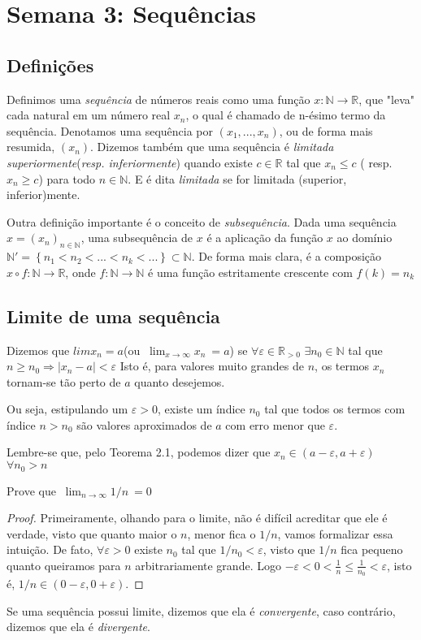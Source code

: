 

\section{Semana 3: Sequências } 
\subsection{Definições}
Definimos uma \textit{sequência} de números reais como uma função $x: \mathbb{N} \rightarrow \mathbb{R}$, que "leva" cada natural em um número real $x_{n}$, o qual é chamado de n-ésimo termo da sequência. Denotamos uma sequência por $(x_{1},...,x_{n})$, ou de forma mais resumida, $(x_{n})$. Dizemos também que uma sequência é \textit{limitada superiormente}(\textit{resp. inferiormente}) quando existe $c \in \mathbb{R}$ tal que $x_{n} \leq c$ ( resp. $x_{n} \geq c$) para todo $n \in \mathbb{N}$. E é dita \textit{limitada} se for limitada (superior, inferior)mente.

Outra definição importante é o conceito de \textit{subsequência}. Dada uma sequência $x=(x_{n})_{n \in \mathbb{N}}$, uma subsequência de $x$ é a aplicação da função $x$ ao domínio $\mathbb{N}'=\left \{ n_{1}<n_{2}<...<n_{k}<... \right \} \subset \mathbb{N}$. De forma mais clara, é a composição $x\circ f: \mathbb{N} \rightarrow \mathbb{R}$, onde $f: \mathbb{N} \rightarrow \mathbb{N}$ é uma função estritamente crescente com $f(k)=n_{k}$

\subsection{Limite de uma sequência}
Dizemos que $limx_{n}=a$(ou $\ \lim_{x\to\infty} x_{n} \ = a$) se $\forall \varepsilon \in \mathbb{R}_{>0}$ $\exists n_{0} \in \mathbb{N}$ tal que $n \geq n_{0} \Rightarrow \left | x_{n}-a \right |<\varepsilon$ Isto é, para valores muito grandes de $n$, os termos $x_{n}$ tornam-se tão perto de $a$ quanto desejemos. 

Ou seja, estipulando um $\varepsilon>0$, existe um índice $n_{0}$ tal que todos os termos com índice $n>n_{0}$ são valores aproximados de $a$ com erro menor que $\varepsilon$.

Lembre-se que, pelo Teorema 2.1, podemos dizer que $x_{n} \in (a-\varepsilon,a+\varepsilon)$ $\forall n_{0}>n$

\begin{prob}
Prove que $\ \lim_{n\to\infty} 1/n \ = 0$
\end{prob}
\begin{proof}
Primeiramente, olhando para o limite, não é difícil acreditar que ele é verdade, visto que quanto maior o $n$, menor fica o $1/n$, vamos formalizar essa intuição. De fato, $\forall \varepsilon >0$ existe $n_{0}$ tal que $1/n_{0} < \varepsilon$, visto que $1/n$ fica pequeno quanto queiramos para $n$ arbitrariamente grande. Logo $-\varepsilon <0< \frac{1}{n} \leq \frac{1}{n_{0}} < \varepsilon$, isto é, $1/n \in (0-\varepsilon, 0+\varepsilon)$.
\end{proof}
Se uma sequência possui limite, dizemos que ela é \textit{convergente}, caso contrário, dizemos que ela é \textit{divergente}.

